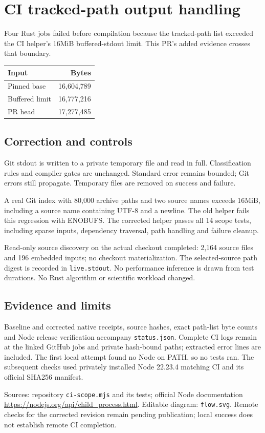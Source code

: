 \documentclass[10pt]{article}
\begin{document}
\section*{CI tracked-path output handling}
Four Rust jobs failed before compilation because the tracked-path list exceeded the CI helper's 16MiB buffered-stdout limit. This PR's added evidence crosses that boundary.
\begin{center}\begin{tabular}{lr}Input&Bytes\\\hline Pinned base&16,604,789\\Buffered limit&16,777,216\\PR head&17,277,485\end{tabular}\end{center}
\begin{center}\end{center}
\subsection*{Correction and controls}
Git stdout is written to a private temporary file and read in full. Classification rules and compiler gates are unchanged. Standard error remains bounded; Git errors still propagate. Temporary files are removed on success and failure.

A real Git index with 80,000 archive paths and two source names exceeds 16MiB, including a source name containing UTF-8 and a newline. The old helper fails this regression with ENOBUFS. The corrected helper passes all 14 scope tests, including sparse inputs, dependency traversal, path handling and failure cleanup.

Read-only source discovery on the actual checkout completed: 2,164 source files and 196 embedded inputs; no checkout materialization. The selected-source path digest is recorded in \texttt{live.stdout}. No performance inference is drawn from test durations. No Rust algorithm or scientific workload changed.
\subsection*{Evidence and limits}
Baseline and corrected native receipts, source hashes, exact path-list byte counts and Node release verification accompany \texttt{status.json}. Complete CI logs remain at the linked GitHub jobs and private hash-bound paths; extracted error lines are included. The first local attempt found no Node on PATH, so no tests ran. The subsequent checks used privately installed Node 22.23.4 matching CI and its official SHA256 manifest.

Sources: repository \texttt{ci-scope.mjs} and its tests; official Node documentation \url{https://nodejs.org/api/child_process.html}. Editable diagram: \texttt{flow.svg}. Remote checks for the corrected revision remain pending publication; local success does not establish remote CI completion.
\end{document}
